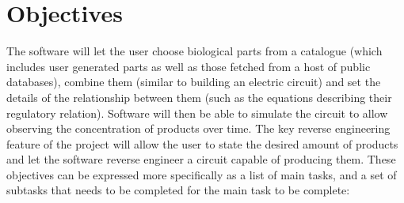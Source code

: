 \documentclass{article}
\begin{document}
	
	
	
	\section{Objectives}
	\par The software will let the user choose biological parts from a catalogue (which includes user generated parts as well as those fetched from a host of public databases), combine them (similar to building an electric circuit) and set the details of the relationship between them (such as the equations describing their regulatory relation). Software will then be able to simulate the circuit to allow observing the concentration of products over time. The key reverse engineering feature of the project will allow the user to state the desired amount of products and let the software reverse engineer a circuit capable of producing them. These objectives can be expressed more specifically as a list of main tasks, and a set of subtasks that needs to be completed for the main task to be complete:
	
\end{document}
